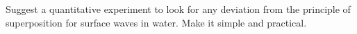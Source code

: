 Suggest a quantitative experiment to look for any
deviation from the principle of superposition for surface
waves in water. Make it simple and practical.
